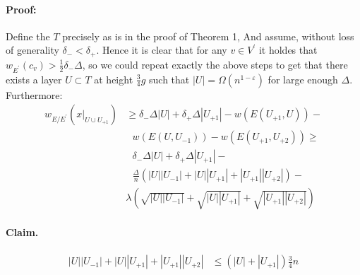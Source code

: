 \documentclass{article}
\begin{document}
\begin{multicols*}{2}
\paragraph{Proof:} Define the $T$ precisely as is in the proof of Theorem 1, And assume, without loss of generality $\delta_{-} < \delta_{+}$. Hence it is clear that for any $v \in V^\prime$ it holdes that $w_{E^\prime}\left( c_{v} \right) > \frac{1}{2}\delta_{-}\Delta$, so we could repeat exactly the above steps to get that there exists a layer $U \subset T$ at height $\frac{3}{4}g$ such that $ |U| = \Omega\left( n^{1-\varepsilon} \right)$ for large enough $\Delta$. Furthermore: 
\begin{equation*}
  \begin{split}
    w_{E/E^{\prime}}\left( x|_{U\cup U_{+1}} \right) & \ge \delta_{-}\Delta|U|+ \delta_{+}\Delta|U_{+1}|  -w\left( E( U_{+1} ,U)  \right) - \\ & \ \ \  w \left( E( U, U_{-1}) \right) - w \left( E( U_{+1}, U_{+2} ) \right)  \ge \\ & \ \ \ \delta_{-}\Delta|U|+ \delta_{+}\Delta|U_{+1}| - \\  & \ \ \  \frac{\Delta}{n}\left( |U||U_{-1}| + |U||U_{+1}| + |U_{+1}||U_{+2}| \right) - \\ &   \lambda \left(  \sqrt{|U||U_{-1}|} + \sqrt{|U||U_{+1}|} + \sqrt{|U_{+1}||U_{+2}|} \right)  
  \end{split}
\end{equation*}
\paragraph{Claim.}  
\begin{equation*}
  \begin{split}
     |U||U_{-1}| + |U||U_{+1}| + |U_{+1}||U_{+2}| & \le \left( |U| + |U_{+1}| \right)\frac{3}{4}n 
  \end{split}
\end{equation*}

\end{multicols*}
\end{document}
